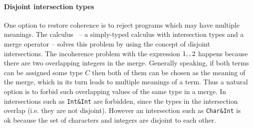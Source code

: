 \paragraph{Disjoint intersection types}
One option to restore coherence is to reject programs which may have
multiple meanings.  The \oldname calculus~\cite{oliveira16disjoint} --
a simply-typed calculus with intersection types and a merge operator
-- solves this problem by using the concept of disjoint intersections.
The incoherence problem with the expression $1 ,, 2$
happens because there are two overlapping integers in the merge. 
Generally speaking, if both terms can be assigned some type $C$
then both of them can be chosen as the meaning of the merge,
which in its turn leads to multiple meanings of a term.
Thus a natural option is to forbid such overlapping
values of the same type in a merge. In \oldname 
intersections such as \lstinline{Int&Int} are forbidden, since 
the types in the intersection overlap (i.e. they are not disjoint). However an intersection 
such as \lstinline{Char&Int} is ok because the set of characters 
and integers are disjoint to each other. 

\begin{comment}
This is precisely the approach taken in \oldname: a merge can only be composed of
two values as long as their types are \emph{disjoint}.  
Disjointness is a binary relation between two types, defined for any types which
do not contain any overlapping types. For example \lstinline{Int&Char}
is disjoint to \lstinline{Bool} because  but \lstinline{
\end{comment}


